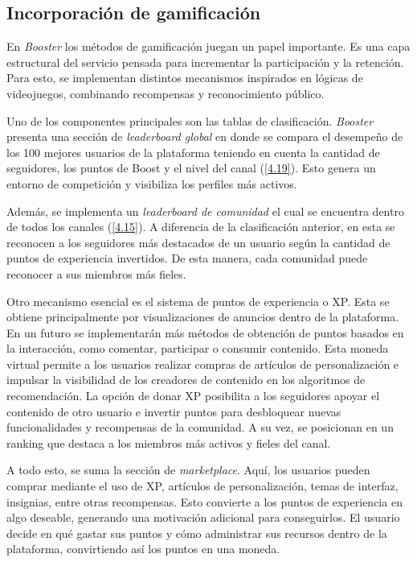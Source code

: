 \subsection{Incorporación de gamificación}

En \textit{Booster} los métodos de gamificación juegan un papel importante. Es una capa estructural del servicio pensada para incrementar la participación y la retención. Para esto, se implementan distintos mecanismos inspirados en lógicas de videojuegos, combinando recompensas y reconocimiento público.

Uno de los componentes principales son las tablas de clasificación. \textit{Booster} presenta una sección de \textit{leaderboard global} en donde se compara el desempeño de los 100 mejores usuarios de la plataforma teniendo en cuenta la cantidad de seguidores, los puntos de Boost y el nivel del canal (\ref{4.19}). Esto genera un entorno de competición y visibiliza los perfiles más activos.

Además, se implementa un \textit{leaderboard de comunidad} el cual se encuentra dentro de todos los canales (\ref{4.15}). A diferencia de la clasificación anterior, en esta se reconocen a los seguidores más destacados de un usuario según la cantidad de puntos de experiencia invertidos. De esta manera, cada comunidad puede reconocer a sus miembros más fieles. 


Otro mecanismo esencial es el sistema de puntos de experiencia o XP. Esta se obtiene principalmente por visualizaciones de anuncios dentro de la plataforma. En un futuro se implementarán más métodos de obtención de puntos basados en la interacción, como comentar, participar o consumir contenido. Esta moneda virtual permite a los usuarios realizar compras de artículos de personalización e impulsar la visibilidad de los creadores de contenido en los algoritmos de recomendación. La opción de donar XP posibilita a los seguidores apoyar el contenido de otro usuario e invertir puntos para desbloquear nuevas funcionalidades y recompensas de la comunidad. A su vez, se posicionan en un ranking que destaca a los miembros más activos y fieles del canal.

A todo esto, se suma la sección de \textit{marketplace}. Aquí, los usuarios pueden comprar mediante el uso de XP, artículos de personalización, temas de interfaz, insignias, entre otras recompensas. Esto convierte a los puntos de experiencia en algo deseable, generando una motivación adicional para conseguirlos. El usuario decide en qué gastar sus puntos y cómo administrar sus recursos dentro de la plataforma, convirtiendo así los puntos en una moneda.

